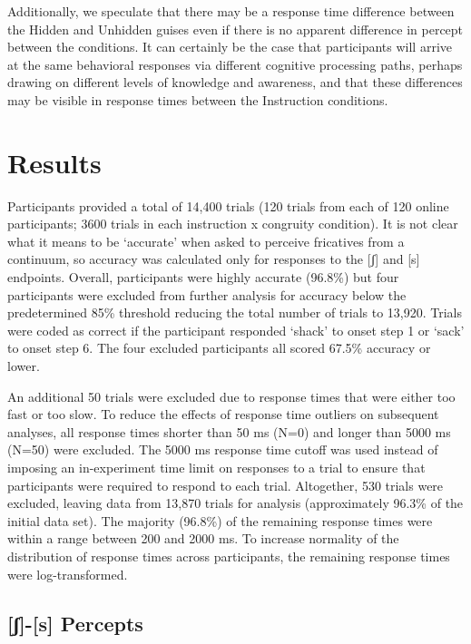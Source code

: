 \documentclass[
  letterpaper,
  DIV=11,
  numbers=noendperiod]{scrartcl}
\begin{document}
Additionally, we speculate that there may be a response time difference
between the Hidden and Unhidden guises even if there is no apparent
difference in percept between the conditions. It can certainly be the
case that participants will arrive at the same behavioral responses via
different cognitive processing paths, perhaps drawing on different
levels of knowledge and awareness, and that these differences may be
visible in response times between the Instruction conditions.

\section{Results}\label{sec-results}

Participants provided a total of 14,400 trials (120 trials from each of
120 online participants; 3600 trials in each instruction x congruity
condition). It is not clear what it means to be `accurate' when asked to
perceive fricatives from a continuum, so accuracy was calculated only
for responses to the {[}ʃ{]} and {[}s{]} endpoints. Overall,
participants were highly accurate (96.8\%) but four participants were
excluded from further analysis for accuracy below the predetermined 85\%
threshold reducing the total number of trials to 13,920. Trials were
coded as correct if the participant responded `shack' to onset step 1 or
`sack' to onset step 6. The four excluded participants all scored 67.5\%
accuracy or lower.

An additional 50 trials were excluded due to response times that were
either too fast or too slow. To reduce the effects of response time
outliers on subsequent analyses, all response times shorter than 50 ms
(N=0) and longer than 5000 ms (N=50) were excluded. The 5000 ms response
time cutoff was used instead of imposing an in-experiment time limit on
responses to a trial to ensure that participants were required to
respond to each trial. Altogether, 530 trials were excluded, leaving
data from 13,870 trials for analysis (approximately 96.3\% of the
initial data set). The majority (96.8\%) of the remaining response times
were within a range between 200 and 2000 ms. To increase normality of
the distribution of response times across participants, the remaining
response times were log-transformed.

\subsection{{[}ʃ{]}-{[}s{]} Percepts}\label{sec-results-fricative}
\end{document}
